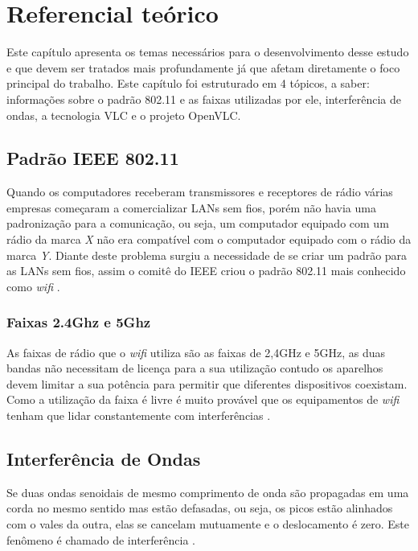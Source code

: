 \chapter{Referencial teórico}

Este capítulo apresenta os temas necessários para o desenvolvimento desse estudo e que devem ser tratados mais profundamente já que afetam diretamente o foco principal do trabalho. Este capítulo foi estruturado em 4 tópicos, a saber: informações sobre o padrão 802.11 e as faixas utilizadas por ele, interferência de ondas, a tecnologia VLC e o projeto OpenVLC.

\section{Padrão IEEE 802.11}

Quando os computadores receberam transmissores e receptores de rádio várias empresas começaram a comercializar LANs sem fios, porém não havia uma padronização para a comunicação, ou seja, um computador equipado com um rádio da marca \emph{X} não era compatível com o computador equipado com o rádio da marca \emph{Y}. Diante deste problema surgiu a necessidade de se criar um padrão para as LANs sem fios, assim o comitê do IEEE criou o padrão 802.11 mais conhecido como \textit{wifi} \cite{tanenbaum}.

\subsection{Faixas 2.4Ghz e 5Ghz}

As faixas de rádio que o \textit{wifi} utiliza são as faixas de 2,4GHz e 5GHz, as duas bandas não necessitam de licença para a sua utilização contudo os aparelhos devem limitar a sua potência para permitir que diferentes dispositivos coexistam. Como a utilização da faixa é livre é muito provável que os equipamentos de \textit{wifi} tenham que lidar constantemente com interferências \cite{tanenbaum}.

\section{Interferência de Ondas}

Se duas ondas senoidais de mesmo comprimento de onda são propagadas em uma corda no mesmo sentido mas estão defasadas, ou seja, os picos estão alinhados com o vales da outra, elas se cancelam mutuamente e o deslocamento é zero. Este fenômeno é chamado de interferência \cite{fisica}. 

